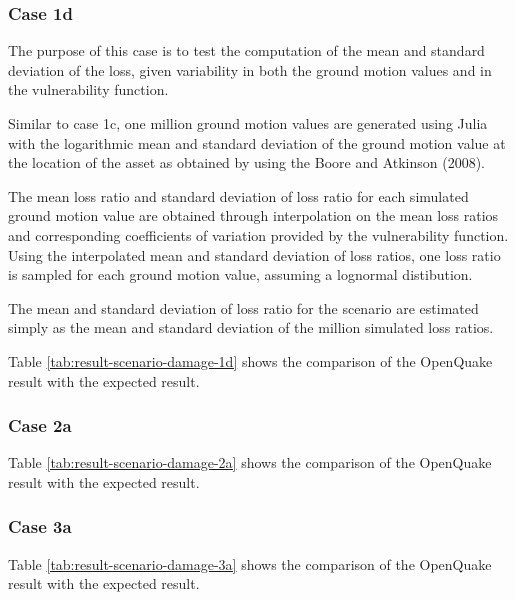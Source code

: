 \subsubsection{Case 1d}
The purpose of this case is to test the computation of the mean and standard deviation of the loss, given variability in both the ground motion values and in the vulnerability function.

Similar to case 1c, one million ground motion values are generated using Julia with the logarithmic mean and standard deviation of the ground motion value at the location of the asset as obtained by using the Boore and Atkinson (2008).

The mean loss ratio and standard deviation of loss ratio for each simulated ground motion value are obtained through interpolation on the mean loss ratios and corresponding coefficients of variation provided by the vulnerability function. Using the interpolated mean and standard deviation of loss ratios, one loss ratio is sampled for each ground motion value, assuming a lognormal distibution.

The mean and standard deviation of loss ratio for the scenario are estimated simply as the mean and standard deviation of the million simulated loss ratios.



Table \ref{tab:result-scenario-damage-1d} shows the comparison of the OpenQuake result with the expected result.

\subsubsection{Case 2a}




Table \ref{tab:result-scenario-damage-2a} shows the comparison of the OpenQuake result with the expected result.

\subsubsection{Case 3a}




Table \ref{tab:result-scenario-damage-3a} shows the comparison of the OpenQuake result with the expected result.